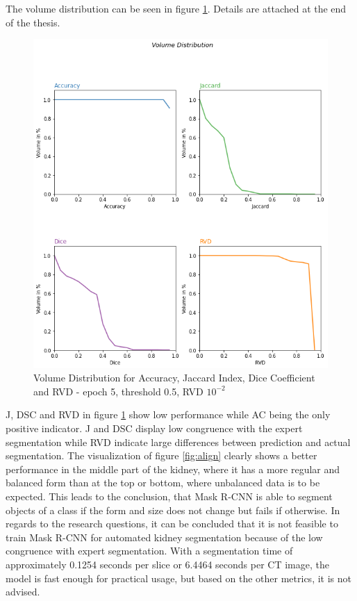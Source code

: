  The volume distribution can be seen in figure \ref{fig:volumeDistribution}. Details are attached at the end of the thesis.
 \begin{figure}[!htbp]
 \centering
 \includegraphics[width=0.9\linewidth]{PICs/volumeDistibution.png}
 \caption{Volume Distribution for Accuracy, Jaccard Index, Dice Coefficient and RVD  - epoch 5, threshold 0.5, RVD $10^{-2}$ }
 \label{fig:volumeDistribution}
 \end{figure}
\ac{J}, \ac{DSC} and \ac{RVD} in figure \ref{fig:volumeDistribution} show low performance while \ac{AC} being the only positive indicator. \ac{J} and \ac{DSC} display low congruence with the expert segmentation while \ac{RVD} indicate large differences between prediction and actual segmentation. The visualization of figure \ref{fig:align} clearly shows a better performance in the middle part of the kidney, where it has a more regular and balanced form than at the top or bottom, where unbalanced data is to be expected. This leads to the conclusion, that Mask R-CNN is able to segment objects of a class if the form and size does not change but fails if otherwise. In regards to the research questions, it can be concluded that it is not feasible to train Mask R-CNN for automated kidney segmentation because of the low congruence with expert segmentation. With a segmentation time of approximately 0.1254 seconds per slice or 6.4464 seconds per CT image, the model is fast enough for practical usage, but based on the other metrics, it is not advised. 
